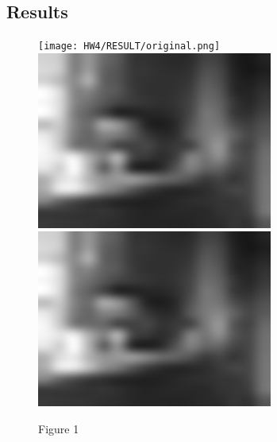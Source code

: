 \documentclass[letter, 11pt]{article}
\begin{document}
\subsection*{Results}
\begin{figure}[H]
        \centering
        \texttt{[image: HW4/RESULT/original.png]}
    \endminipage\hfill
        \centering
        \includegraphics[width=\textwidth]{HW3/RESULT/tiny.png}
    \endminipage\hfill
        \centering
        \includegraphics[width=\textwidth]{HW3/RESULT/tiny.png}
    \endminipage\hfill
    \caption*{Figure 1}
\end{figure}
\end{document}
